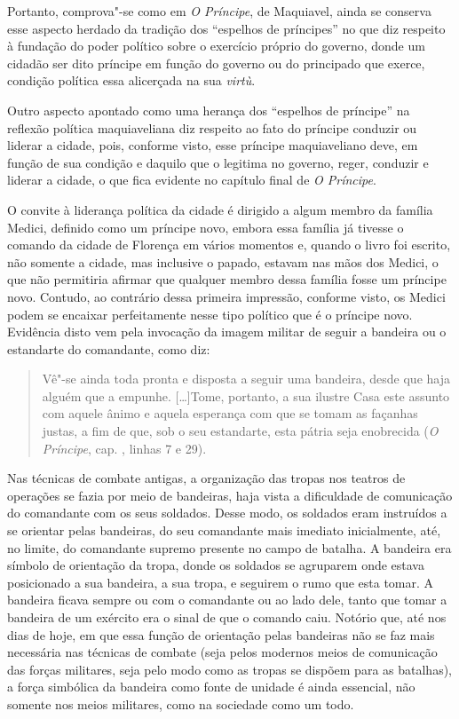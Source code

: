 Portanto, comprova"-se como em \emph{O Príncipe}, de Maquiavel, ainda se
conserva esse aspecto herdado da tradição dos ``espelhos de príncipes''
no que diz respeito à fundação do poder político sobre o exercício
próprio do governo, donde um cidadão ser dito príncipe em função do
governo ou do principado que exerce, condição política essa alicerçada
na sua \emph{virtù}.

Outro aspecto apontado como uma herança dos ``espelhos de príncipe'' na
reflexão política maquiaveliana diz respeito ao fato do príncipe
conduzir ou liderar a cidade, pois, conforme visto, esse príncipe
maquiaveliano deve, em função de sua condição e daquilo que o legitima
no governo, reger, conduzir e liderar a cidade, o que fica evidente no
capítulo final de \emph{O Príncipe}.

O convite à liderança política da cidade é dirigido a algum membro da
família Medici, definido como um príncipe novo, embora essa família já
tivesse o comando da cidade de Florença em vários momentos e, quando o
livro foi escrito, não somente a cidade, mas inclusive o papado, estavam
nas mãos dos Medici, o que não permitiria afirmar que qualquer membro
dessa família fosse um príncipe novo. Contudo, ao contrário dessa
primeira impressão, conforme visto, os Medici podem se encaixar
perfeitamente nesse tipo político que é o príncipe novo. Evidência disto
vem pela invocação da imagem militar de seguir a bandeira ou o
estandarte do comandante, como diz:

\begin{quote}
Vê"-se ainda toda pronta e disposta a seguir uma bandeira, desde
que haja alguém que a empunhe. {[}\ldots{}{]}Tome, portanto, a sua ilustre
Casa este assunto com aquele ânimo e aquela esperança com que se tomam
as façanhas justas, a fim de que, sob o seu estandarte, esta pátria seja
enobrecida (\emph{O Príncipe}, cap. , linhas 7 e 29).
\end{quote}

Nas técnicas de combate antigas, a organização das tropas nos teatros de
operações se fazia por meio de bandeiras, haja vista a dificuldade de
comunicação do comandante com os seus soldados. Desse modo, os soldados
eram instruídos a se orientar pelas bandeiras, do seu comandante mais
imediato inicialmente, até, no limite, do comandante supremo presente no
campo de batalha. A bandeira era símbolo de orientação da tropa, donde
os soldados se agruparem onde estava posicionado a sua bandeira, a sua
tropa, e seguirem o rumo que esta tomar. A bandeira ficava sempre ou com
o comandante ou ao lado dele, tanto que tomar a bandeira de um exército
era o sinal de que o comando caiu. Notório que, até nos dias de hoje, em
que essa função de orientação pelas bandeiras não se faz mais necessária
nas técnicas de combate (seja pelos modernos meios de comunicação das
forças militares, seja pelo modo como as tropas se dispõem para as
batalhas), a força simbólica da bandeira como fonte de unidade é ainda
essencial, não somente nos meios militares, como na sociedade como um
todo.


